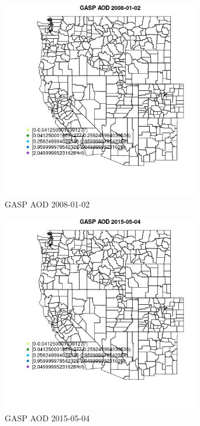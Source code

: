 \begin{figure} 
\centering  
\includegraphics[width=0.77\textwidth]{Code_Outputs/Report_ML_input_PM25_Step4_part_e_de_duplicated_aves_compiled_2019-05-18wNAs_MapObsGASP_AOD2008-01-02.jpg} 
\caption{\label{fig:Report_ML_input_PM25_Step4_part_e_de_duplicated_aves_compiled_2019-05-18wNAsMapObsGASP_AOD2008-01-02}GASP AOD 2008-01-02} 
\end{figure} 
 

\begin{figure} 
\centering  
\includegraphics[width=0.77\textwidth]{Code_Outputs/Report_ML_input_PM25_Step4_part_e_de_duplicated_aves_compiled_2019-05-18wNAs_MapObsGASP_AOD2015-05-04.jpg} 
\caption{\label{fig:Report_ML_input_PM25_Step4_part_e_de_duplicated_aves_compiled_2019-05-18wNAsMapObsGASP_AOD2015-05-04}GASP AOD 2015-05-04} 
\end{figure} 
 

